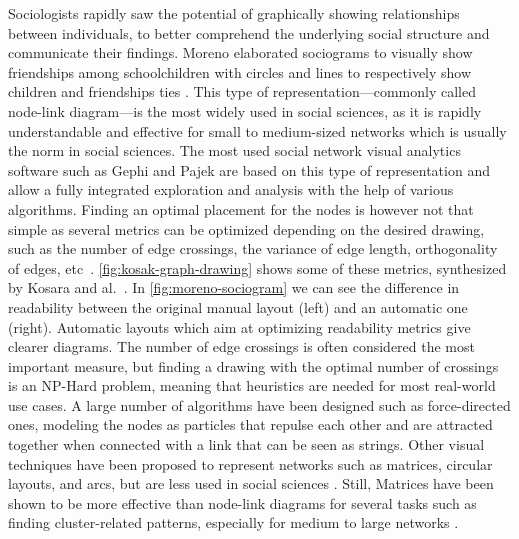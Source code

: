 Sociologists rapidly saw the potential of graphically showing relationships between individuals, to better comprehend the underlying social structure and communicate their findings.
Moreno elaborated sociograms to visually show friendships among schoolchildren with circles and lines to respectively show children and friendships ties \cite{morenoWhoShallSurvive1934}.
This type of representation---commonly called node-link diagram---is the most widely used in social sciences, as it is rapidly understandable and effective for small to medium-sized networks which is usually the norm in social sciences.
The most used social network visual analytics software such as Gephi \cite{Gephi} and Pajek \cite{mrvarAnalysisVisualizationLarge2016} are based on this type of representation and allow a fully integrated exploration and analysis with the help of various algorithms.
Finding an optimal placement for the nodes is however not that simple as several metrics can be optimized depending on the desired drawing, such as the number of edge crossings, the variance of edge length, orthogonality of edges, etc~\cite{cristofoliPrincipesUsagesDessins, kosakAutomatingLayoutNetwork1994}. \autoref{fig:kosak-graph-drawing} shows some of these metrics, synthesized by Kosara and al.~\cite{kosakAutomatingLayoutNetwork1994}.
In \autoref{fig:moreno-sociogram} we can see the difference in readability between the original manual layout (left) and an automatic one (right).
Automatic layouts which aim at optimizing readability metrics give clearer diagrams.
The number of edge crossings is often considered the most important measure, but finding a drawing with the optimal number of crossings is an NP-Hard problem, meaning that heuristics are needed for most real-world use cases.
A large number of algorithms have been designed such as force-directed ones, modeling the nodes as particles that repulse each other and are attracted together when connected with a link that can be seen as strings.
Other visual techniques have been proposed to represent networks such as matrices, circular layouts, and arcs, but are less used in social sciences \cite{mcguffinSimpleAlgorithmsNetwork2012}.
Still, Matrices have been shown to be more effective than node-link diagrams for several tasks such as finding cluster-related patterns, especially for medium to large networks \cite{ghoniemComparisonReadabilityGraphs2004, abdelaalComparativeEvaluationBipartite2022}.

